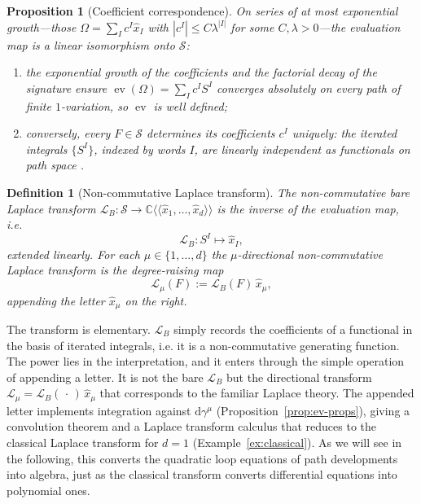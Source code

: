 \documentclass[11pt,a4paper]{article}
\newtheorem{proposition}[theorem]{Proposition}
\newtheorem{definition}[theorem]{Definition}
\DeclareMathOperator{\ev}{ev}
\newcommand{\xh}{\hat{x}}
\newcommand{\cL}{\mathcal{L}}
\newcommand{\dd}{\mathrm{d}}
\begin{document}
\begin{proposition}[Coefficient correspondence]\label{prop:inversion}
On series of at most exponential growth---those $\Omega=\sum_I c^I\xh_I$ with $|c^I|\leq C\lambda^{|I|}$ for some $C,\lambda>0$---the evaluation map is a linear isomorphism onto $\mathcal{S}$:
\begin{enumerate}
\item the exponential growth of the coefficients and the factorial decay of the signature ensure $\ev(\Omega)=\sum_I c^I S^I$ converges absolutely on every path of finite $1$-variation, so $\ev$ is well defined;
\item conversely, every $F\in\mathcal{S}$ determines its coefficients $c^I$ uniquely: the iterated integrals $\{S^I\}$, indexed by words $I$, are linearly independent as functionals on path space
\cite{chen1957integration,reutenauer2003free,hambly2010uniqueness}.
\end{enumerate}
\end{proposition}

\begin{definition}[Non-commutative Laplace transform]\label{def:nc-laplace}
The \emph{non-commutative bare Laplace transform} $\cL_B\colon\mathcal{S}\to\mathbb{C}\langle\langle\xh_1,\ldots,\xh_d\rangle\rangle$ is the inverse of the evaluation map, i.e. 
\begin{equation}
  \cL_B\colon S^{I}\longmapsto\xh_I ,
\end{equation}
extended linearly. For each $\mu\in\{1,\ldots,d\}$ the \emph{$\mu$-directional non-commutative Laplace transform} is the degree-raising map
\begin{equation}\label{eq:nc-laplace}
  \cL_\mu(F) := \cL_B(F)\,\xh_\mu ,
\end{equation}
appending the letter $\xh_\mu$ on the right.
\end{definition}

The transform is elementary. $\cL_B$ simply records the coefficients of a functional in the basis of iterated integrals, i.e. it is a non-commutative generating function. The power lies in the interpretation, and it enters through the simple operation of appending a letter. It is not the bare $\cL_B$ but the directional transform $\cL_\mu = \cL_B(\,\cdot\,)\,\xh_\mu$ that corresponds to the familiar Laplace theory. The appended letter implements integration against $\dd\gamma^\mu$ (Proposition~\ref{prop:ev-props}), giving a convolution theorem and a Laplace transform calculus that reduces to the classical Laplace transform for $d=1$ (Example~\ref{ex:classical}). As we will see in the following, this converts the quadratic loop equations of path developments into algebra, just as the classical transform converts differential
equations into polynomial ones.
\end{document}
